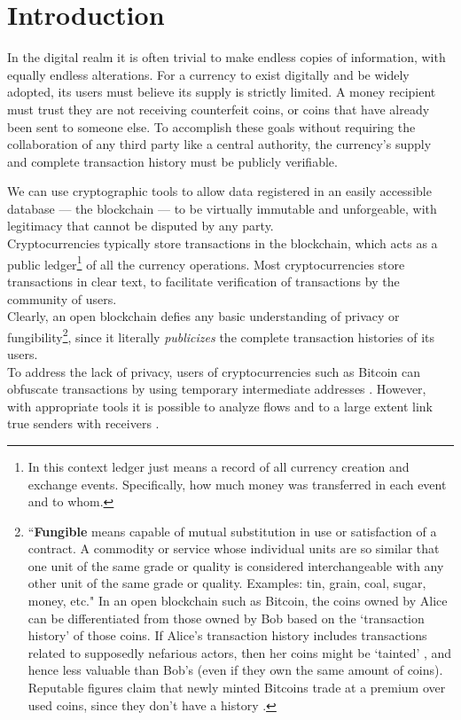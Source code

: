 \chapter{Introduction}%
\label{chapter:introduction}

In the digital realm it is often trivial to make endless copies of information, with equally endless alterations. For a currency to exist digitally and be widely adopted, its users must believe its supply is strictly limited. A money recipient must trust they are not receiving counterfeit coins, or coins that have already been sent to someone else. To accomplish these goals without requiring the collaboration of any third party like a central authority, the currency's supply and complete transaction history must be publicly verifiable.

We can use cryptographic tools to allow data registered in an easily accessible database --- the blockchain --- to be virtually immutable and unforgeable, with legitimacy that cannot be disputed by any party.
\\ \newline
Cryptocurrencies typically store transactions in the blockchain, which acts as a public ledger\footnote{In this context ledger just means a record of all currency creation and exchange events. Specifically, how much money was transferred in each event and to whom.} of all the currency operations. Most cryptocurrencies store transactions in clear text, to facilitate verification of transactions by the community of users.
\\ \newline
Clearly, an open blockchain defies any basic understanding of privacy or fungibility\footnote{``\textbf{Fungible} means capable of mutual substitution in use or satisfaction of a contract. A commodity or service whose individual units are so similar that one unit of the same grade or quality is considered interchangeable with any other unit of the same grade or quality. Examples: tin, grain, coal, sugar, money, etc." \cite{mises-org-fungible} In an open blockchain such as Bitcoin, the coins owned by Alice can be differentiated from those owned by Bob based on the `transaction history' of those coins. If Alice's transaction history includes transactions related to supposedly nefarious actors, then her coins might be `tainted' \cite{bitcoin-big-bang-taint}, and hence less valuable than Bob's (even if they own the same amount of coins). Reputable figures claim that newly minted Bitcoins trade at a premium over used coins, since they don't have a history \cite{new-bitcoin-premium}.}, since it literally {\em publicizes} the complete transaction histories of its users.
\\ \newline
To address the lack of privacy, users of cryptocurrencies such as Bitcoin can obfuscate transactions by using temporary intermediate addresses \cite{DBLP:journals/corr/NarayananM17}. However, with appropriate tools it is possible to analyze flows and to a large extent link true senders with receivers \cite{DBLP:journals/corr/ShenTuY15b, DK-police-tracing-btc, Andrew-Cox-Sandia, chainalysis-2020-report}.

